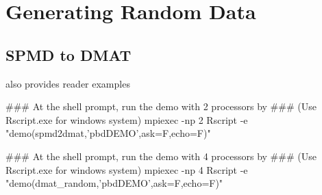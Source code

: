 \section{Generating Random Data}
\label{sec:reader}



\subsection{SPMD to DMAT}
\label{sec:spmd2dmat}

 also provides reader examples
\begin{Command}
### At the shell prompt, run the demo with 2 processors by
### (Use Rscript.exe for windows system)
mpiexec -np 2 Rscript -e "demo(spmd2dmat,'pbdDEMO',ask=F,echo=F)"
\end{Command}






\begin{Command}
### At the shell prompt, run the demo with 4 processors by
### (Use Rscript.exe for windows system)
mpiexec -np 4 Rscript -e "demo(dmat_random,'pbdDEMO',ask=F,echo=F)"
\end{Command}